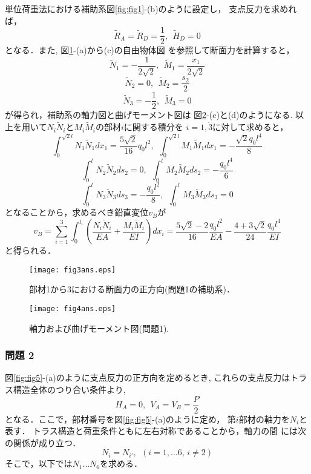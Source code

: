 \documentclass[10pt,a4j]{jarticle}
\begin{document}
	単位荷重法における補助系図\ref{fig:fig1}-(b)のように設定し，
	支点反力を求めれば，
	\[
		\tilde R_A= \tilde R_D= \frac{1}{2}, \ \ \tilde H_D=0
	\]
	となる．また, 図\ref{fig:fig3}-(a)から(c)の自由物体図
	を参照して断面力を計算すると，
	\[
		\tilde N_1=-\frac{1}{2\sqrt{2}}, \ \ \tilde M_1=\frac{x_1}{2\sqrt{2}}
	\]
	\[
		\tilde N_2=0, \ \ \tilde M_2=\frac{s_2}{2}
	\]
	\[
		\tilde N_3=-\frac{1}{2}, \ \ \tilde M_3=0
	\]
	が得られ，補助系の軸力図と曲げモーメント図は 図\ref{fig:fig4}-(c)と(d)のようになる.
	以上を用いて$N_i\tilde N_i$と$M_i\tilde M_i$の部材$i$に関する積分を
	$i=1,\dot 3$に対して求めると，
	\[
		\int _0^{\sqrt{2}l} N_1 \tilde N_1dx_1=\frac{5\sqrt{2}}{16}q_0l^2
		, \ \ 
		\int _0^{\sqrt{2}l} M_1 \tilde M_1dx_1=-\frac{\sqrt{2}q_0l^4}{8}
	\]
	\[
		\int _0^l N_2 \tilde N_2ds_2=0, \ \ 
		\int _0^l M_2 \tilde M_2ds_2=-\frac{q_0l^4}{6}
	\]
	\[
		\int _0^l N_3 \tilde N_3ds_3=-\frac{q_0l^2}{8}, \ \ 
		\int _0^l M_3 \tilde M_3ds_3=0
	\]
	となることから，求めるべき鉛直変位$v_B$が
	\[
		v_B=
		\sum_{i=1}^3
		\int_0^{l_i} \left(
			\frac{N_i\tilde N_i}{EA}
			+
			\frac{M_i\tilde M_i}{EI}
		\right) dx_i
		=
		\frac{5\sqrt{2}-2}{16}\frac{q_0l^2}{EA}
		-
		\frac{4+3\sqrt{2}}{24}
		\frac{q_0l^4}{EI}
	\]
	と得られる．
\begin{figure}[h]
	\begin{center}
	\texttt{[image: fig3ans.eps]} 
	\end{center}
	\caption{部材1から3における断面力の正方向(問題1の補助系)．}
	\label{fig:fig3}
\end{figure}
\begin{figure}[h]
	\begin{center}
	\texttt{[image: fig4ans.eps]} 
	\end{center}
	\caption{軸力および曲げモーメント図(問題1).}
	\label{fig:fig4}
\end{figure}
\clearpage
\subsubsection*{問題 2}
図\ref{fig:fig5}-(a)のように支点反力の正方向を定めるとき, 
これらの支点反力はトラス構造全体のつり合い条件より, 
\[
	H_A=0, \ \ V_A=V_B=\frac{P}{2}
\]
となる．ここで，部材番号を図\ref{fig:fig5}-(a)のように定め，
第$i$部材の軸力を$N_i$と表す．
トラス構造と荷重条件ともに左右対称であることから，軸力の間
には次の関係が成り立つ．
\[
	N_i=N_{i'}, \ \ (i=1,\dots 6, \, i\neq 2)
\]
そこで，以下では$N_1 \dots N_6$を求める．
\end{document}
